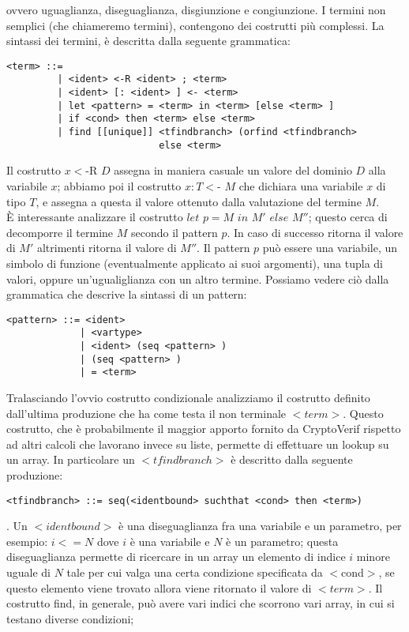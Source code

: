 \documentclass[a4paper,openright,twoside,12pt]{report}
\begin{document}
ovvero uguaglianza, diseguaglianza, disgiunzione e congiunzione. 
I termini non semplici (che chiameremo termini), contengono dei costrutti pi\`u complessi.
La sintassi dei termini, \`e descritta dalla seguente grammatica:
\begin{verbatim}
<term> ::= 
         | <ident> <-R <ident> ; <term>
         | <ident> [: <ident> ] <- <term>
         | let <pattern> = <term> in <term> [else <term> ]
         | if <cond> then <term> else <term>
         | find [[unique]] <tfindbranch> (orfind <tfindbranch> 
                           else <term>
\end{verbatim}
Il costrutto $x<$-R $D$ assegna in maniera casuale un valore del dominio $D$ alla variabile $x$; abbiamo poi il costrutto $x:T<$- $M$ che dichiara una variabile $x$ di tipo $T$,
e assegna a questa il valore ottenuto dalla valutazione del termine $M$. \\
\`E interessante analizzare il costrutto $let$ $p=M$ $in$ $M'$ $else$ $M''$; questo cerca di decomporre il termine $M$ secondo il pattern $p$. In caso di successo ritorna
il valore di $M'$ altrimenti ritorna il valore di $M''$. Il pattern $p$ pu\`o essere una variabile, un simbolo di funzione (eventualmente applicato ai suoi argomenti),
una tupla di valori, oppure un'ugualiglianza con un altro termine. Possiamo vedere ci\`o dalla grammatica che descrive la sintassi di un pattern:
\begin{verbatim}
<pattern> ::= <ident>
             | <vartype>
             | <ident> (seq <pattern> )
             | (seq <pattern> )
             | = <term>
\end{verbatim}
Tralasciando l'ovvio costrutto condizionale analizziamo il costrutto definito dall'ultima produzione che ha come testa il non terminale $<term>$.
Questo costrutto, che \`e probabilmente il maggior apporto fornito da CryptoVerif rispetto ad altri calcoli che lavorano invece su liste, permette di effettuare un lookup su un array.
In particolare un $<tfindbranch>$ \`e descritto dalla seguente produzione:
\begin{verbatim}<tfindbranch> ::= seq(<identbound> suchthat <cond> then <term>)\end{verbatim}. 
Un $<identbound>$ \`e una diseguaglianza fra una variabile e un parametro, per esempio: $i<=N$ dove $i$ \`e una variabile e $N$ \`e un parametro; questa diseguaglianza permette
di ricercare in un array un elemento di indice $i$ minore uguale di $N$ tale per cui valga una certa condizione specificata da $<$cond$>$,
se questo elemento viene trovato allora viene ritornato il valore di $<term>$. Il costrutto find, in generale, pu\`o avere vari indici che scorrono vari array, in cui si testano diverse condizioni; 
\end{document}
